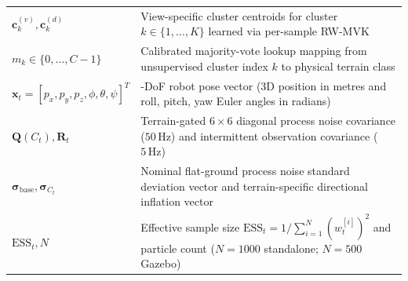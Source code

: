 \documentclass[11pt, a4paper]{article}
\begin{document}
\begin{table}[htbp]
\begin{tabularx}{\textwidth}{l >{\raggedright\arraybackslash}X}
        $\mathbf{c}_k^{(v)}, \mathbf{c}_k^{(d)}$ & View-specific cluster centroids for cluster $k \in \{1,\dots,K\}$ learned via per-sample RW-MVK \\
        $m_k \in \{0,\dots,C-1\}$ & Calibrated majority-vote lookup mapping from unsupervised cluster index $k$ to physical terrain class \\
        $\mathbf{x}_t = [p_x,p_y,p_z,\phi,\theta,\psi]^T$ & 6-DoF robot pose vector (3D position in metres and roll, pitch, yaw Euler angles in radians) \\
        $\mathbf{Q}(C_t), \mathbf{R}_t$ & Terrain-gated $6\times 6$ diagonal process noise covariance ($50\,\text{Hz}$) and intermittent observation covariance ($5\,\text{Hz}$) \\
        $\bm{\sigma}_{\text{base}}, \bm{\sigma}_{C_t}$ & Nominal flat-ground process noise standard deviation vector and terrain-specific directional inflation vector \\
        $\mathrm{ESS}_t, N$ & Effective sample size $\mathrm{ESS}_t = 1/\sum_{i=1}^N (w_t^{[i]})^2$ and particle count ($N = 1000$ standalone; $N = 500$ Gazebo) \\
        \bottomrule
    \end{tabularx}
\end{table}
\end{document}
